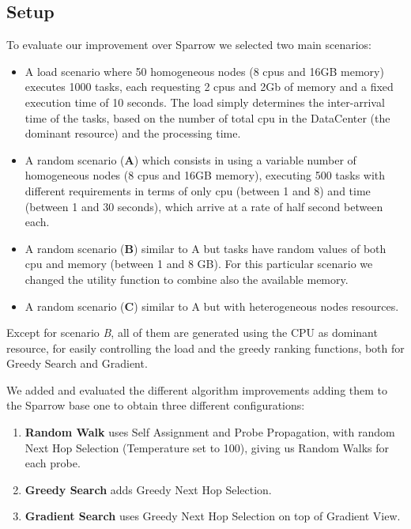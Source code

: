 \documentclass[conference]{IEEEtran}
\begin{document}
\subsection{Setup}
To evaluate our improvement over Sparrow we selected two main scenarios:
\begin{itemize}

\item A load scenario where 50 homogeneous nodes (8 cpus and 16GB memory) executes 1000 tasks, each requesting 2 cpus and 2Gb of memory and a fixed execution time of 10 seconds. The load simply determines the inter-arrival time of the tasks, based on the number of total cpu in the DataCenter (the dominant resource) and the processing time.

\item A random scenario (\textbf{A}) which consists in using  a variable number of homogeneous nodes (8 cpus and 16GB memory), executing 500 tasks with different requirements in terms of only cpu (between 1 and 8) and time (between 1 and 30 seconds), which arrive at a rate of half second between each.

\item A random scenario (\textbf{B}) similar to A but tasks have random values of both cpu and memory (between 1 and 8 GB). For this particular scenario we changed the utility function to combine also the available memory.

\item A random scenario (\textbf{C}) similar to A but with heterogeneous nodes resources.

\end{itemize}

Except for scenario \textit{B}, all of them are generated using the CPU as dominant resource, for easily controlling the load and the greedy ranking functions, both for Greedy Search and Gradient.

We added and evaluated the different algorithm improvements adding them to the Sparrow base one to obtain three different configurations: 
\begin{enumerate}
\item \textbf{Random Walk} uses Self Assignment and Probe Propagation, with random Next Hop Selection (Temperature set to 100), giving us Random Walks for each probe. 
\item \textbf{Greedy Search} adds Greedy Next Hop Selection.
\item \textbf{Gradient Search} uses Greedy Next Hop Selection on top of Gradient View.
\end{enumerate}
\end{document}
